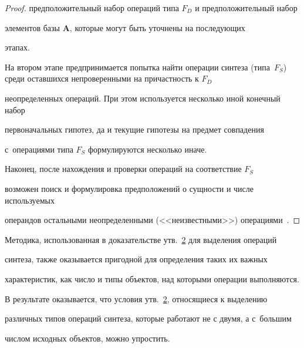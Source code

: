 \begin{proof}
предположительный набор операций типа $F_{D}$ и предположительный набор

элементов базы $\mathbf{A}$, которые могут быть уточнены на последующих

этапах.



На втором этапе предпринимается попытка найти операции синтеза (типа~$F_{S}$) среди оставшихся непроверенными на причастность к $F_{D}$

неопределенных операций. При этом используется несколько иной конечный набор

первоначальных гипотез, да и текущие гипотезы на предмет совпадения 

с~операциями типа $F_{S}$ формулируются несколько иначе.



Наконец, после нахождения и проверки операций на соответствие $F_{S}$

возможен поиск и формулировка предположений о сущности и числе используемых

операндов остальными неопределенными (<<неизвестными>>) операциями~\cite{krylov:bib3}.

\end{proof}



\smallskip



Методика, использованная в доказательстве утв.~\hyperlink{kr:utv2}{2} для выделения операций

синтеза, также оказывается пригодной для определения таких их важных

характеристик, как число и типы объектов, над которыми операции выполняются.

В результате оказывается, что условия утв.~\hyperlink{kr:utv2}{2}, относящиеся к выделению

различных типов операций синтеза, которые работают не с двумя, а с~большим

числом исходных объектов, можно упростить.



\smallskip




